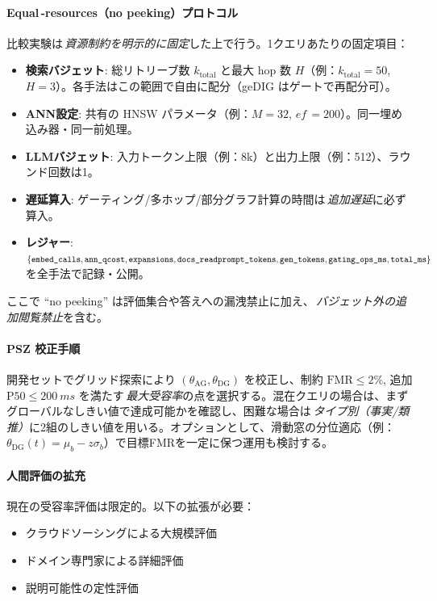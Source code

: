 \documentclass[ja=standard,xelatex]{bxjsarticle}
\begin{document}
\paragraph{Equal\,\mbox{-}resources（no peeking）プロトコル}\label{sec:equal_resources}
比較実験は\,\emph{資源制約を明示的に固定}した上で行う。1クエリあたりの固定項目：
\begin{itemize}
  \item \textbf{検索バジェット}: 総リトリーブ数 $k_{\text{total}}$ と最大 hop 数 $H$（例：$k_{\text{total}}{=}50$, $H{=}3$）。各手法はこの範囲で自由に配分（geDIG はゲートで再配分可）。
  \item \textbf{ANN設定}: 共有の HNSW パラメータ（例：$M{=}32$, $ef\,{=}200$）。同一埋め込み器・同一前処理。
  \item \textbf{LLMバジェット}: 入力トークン上限（例：8k）と出力上限（例：512）、ラウンド回数は1。
  \item \textbf{遅延算入}: ゲーティング/多ホップ/部分グラフ計算の時間は\,\emph{追加遅延}に必ず算入。
  \item \textbf{レジャー}: $\{\texttt{embed\_calls},\texttt{ann\_qcost},\texttt{expansions},\texttt{docs\_read}\\ \texttt{prompt\_tokens},\texttt{gen\_tokens},\texttt{gating\_ops\_ms},\texttt{total\_ms}\}$ を全手法で記録・公開。
\end{itemize}
ここで “no peeking” は評価集合や答えへの漏洩禁止に加え、\,\emph{バジェット外の追加閲覧禁止}を含む。

\paragraph{PSZ 校正手順}\label{sec:psz_calibration}
開発セットでグリッド探索により $(\theta_{\mathrm{AG}},\theta_{\mathrm{DG}})$ を校正し、制約 $\mathrm{FMR}\le2\%$, 追加 $\mathrm{P50}\le\SI{200}{ms}$ を満たす\,\emph{最大受容率}の点を選択する。混在クエリの場合は、まずグローバルなしきい値で達成可能かを確認し、困難な場合は\,\emph{タイプ別（事実/類推）}に2組のしきい値を用いる。オプションとして、滑動窓の分位適応（例：$\theta_{\mathrm{DG}}(t){=}\mu_b{-}z\sigma_b$）で目標FMRを一定に保つ運用も検討する。

\paragraph{人間評価の拡充}
現在の受容率評価は限定的。以下の拡張が必要：
\begin{itemize}
  \item クラウドソーシングによる大規模評価
  \item ドメイン専門家による詳細評価
  \item 説明可能性の定性評価
\end{itemize}
\end{document}
